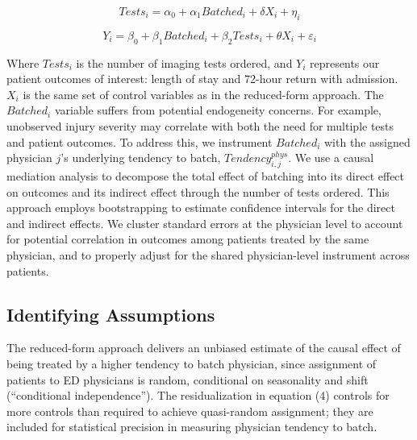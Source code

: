 \documentclass{article}
\begin{document}
\begin{equation}
Tests_i = \alpha_0 + \alpha_1 Batched_i + \delta X_i + \eta_i
\end{equation}

\begin{equation}
Y_i = \beta_0 + \beta_1 Batched_i + \beta_2 Tests_i + \theta X_i + \varepsilon_i
\end{equation}

Where \(Tests_i\) is the number of imaging tests ordered, and \(Y_i\)
represents our patient outcomes of interest: length of stay and 72-hour
return with admission. \(X_i\) is the same set of control variables as
in the reduced-form approach. The \(Batched_i\) variable suffers from
potential endogeneity concerns. For example, unobserved injury severity
may correlate with both the need for multiple tests and patient
outcomes. To address this, we instrument \(Batched_i\) with the assigned
physician \(j\)'s underlying tendency to batch,
\(Tendency_{i,j}^{phys}\). We use a causal mediation analysis to
decompose the total effect of batching into its direct effect on
outcomes and its indirect effect through the number of tests ordered.
This approach employs bootstrapping to estimate confidence intervals for
the direct and indirect effects. We cluster standard errors at the
physician level to account for potential correlation in outcomes among
patients treated by the same physician, and to properly adjust for the
shared physician-level instrument across patients.

\hypertarget{identifying-assumptions}{%
\subsection{Identifying Assumptions}\label{identifying-assumptions}}

The reduced-form approach delivers an unbiased estimate of the causal
effect of being treated by a higher tendency to batch physician, since
assignment of patients to ED physicians is random, conditional on
seasonality and shift (``conditional independence''). The
residualization in equation (4) controls for more controls than required
to achieve quasi-random assignment; they are included for statistical
precision in measuring physician tendency to batch.
\end{document}
